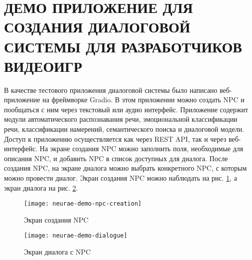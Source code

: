 \section{ДЕМО ПРИЛОЖЕНИЕ ДЛЯ СОЗДАНИЯ ДИАЛОГОВОЙ СИСТЕМЫ ДЛЯ РАЗРАБОТЧИКОВ ВИДЕОИГР}
В качестве тестового приложения диалоговой системы было написано веб-приложение на фреймворке Gradio. В этом приложении можно создать NPC и пообщаться с ним через текстовый или аудио интерфейс. Приложение содержит модули автоматического распознавания речи, эмоциональной классификации речи, классификации намерений, семантического поиска и диалоговой модели. Доступ к приложению осуществляется как через REST API, так и через веб-интерфейс. На экране создания NPC можно заполнить поля, необходимые для описания NPC, и добавить NPC в список доступных для диалога. После создания NPC, на экране диалога можно выбрать конкретного NPC, с которым можно провести диалог. Экран создания NPC можно наблюдать на рис. \ref{demo-npc-creation}, а экран диалога на рис. \ref{demo-dialogue}.
\begin{figure}[H]
    \centering
    \texttt{[image: neurae-demo-npc-creation]}
    \caption{Экран создания NPC}
    \label{demo-npc-creation}
\end{figure}
\begin{figure}[H]
    \centering
    \texttt{[image: neurae-demo-dialogue]}
    \caption{Экран диалога с NPC}
    \label{demo-dialogue}
\end{figure}